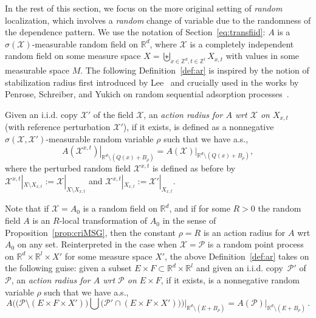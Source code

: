 \documentclass[AHL,Unicode,longabstracts]{cedram}
\newcommand{\R}{\mathbb R}
\newcommand{\Z}{\mathbb Z}
\newcommand{\X}{\mathcal X}
\newcommand{\Pc}{\mathcal P}
\begin{document}
In the rest of this section, we focus on the more original setting of \emph{random} localization, which involves a \emph{random} change of variable due to the randomness of the dependence pattern. We use the notation of Section~\ref{eq:transfiid}: $A$ is a $\sigma(\X)$-measurable random field on $\R^d$, where $\X$ is a completely independent random field on some measure space $X=\biguplus_{x\in\Z^d,t\in\Z^l}X_{x,t}$ with values in some measurable space $M$. The following Definition~\ref{def:ar} is inspired by the notion of stabilization radius first introduced by Lee~\cite{Lee-97,Lee-99} and crucially used in the works by Penrose, Schreiber, and Yukich on random sequential adsorption processes~\cite{Penrose-05,Penrose-Yukich-02,PY-05,Schreiber-Penrose-Yukich-07}.
\begin{defi}\label{def:ar}
Given an i.i.d. copy $\X'$ of the field $\X$, an \emph{ action radius for $A$ wrt $\X$ on $X_{x,t}$} (with reference perturbation $\X'$), if it exists, is defined as a nonnegative $\sigma(\X,\X')$-measurable random variable $\rho$ such that we have a.s.,
\[
\left.A(\X^{x,t})\right|_{\R^d\setminus (Q(x)+B_\rho)}=\left.A(\X)\right|_{\R^d\setminus(Q(x)+B_\rho)},
\]
where the perturbed random field $\X^{x,t}$ is defined as before by $\X^{x,t}|_{X\setminus X_{x,t}}:=\X|_{X\setminus X_{x,t}}$ and $\X^{x,t}|_{X_{x,t}}:=\X'|_{X_{x,t}}$.
\end{defi}
Note that if $\X=A_0$ is a random field on $\R^d$, and if for some $R>0$ the random field $A$ is an $R$-local transformation of $A_0$ in the sense of Proposition~\ref{prop:criMSG}, then the constant $\rho=R$ is an action radius for $A$ wrt $A_0$ on any set. Reinterpreted in the case when $\X=\Pc$ is a random point process on $\R^d\times\R^{l}\times X'$ for some measure space $X'$, the above Definition~\ref{def:ar} takes on the following guise: given a subset $E\times F\subset \R^d\times \R^{l}$ and given an i.i.d. copy~$\Pc'$ of~$\Pc$, an \emph{action radius for $A$ wrt $\Pc$ on $E\times F$}, if it exists, is a nonnegative random variable $\rho$ such that we have a.s.,
\[
A\Big(\big(\Pc\setminus (E\times F\times X')\big)\bigcup \big(\Pc'\cap (E\times F\times X')\big)\Big)\Big|_{\R^d\setminus (E+B_\rho)}=A(\Pc)\big|_{\R^d\setminus (E+B_\rho)}\,.
\]
\end{document}
